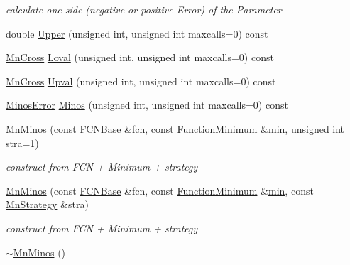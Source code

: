 \begin{DoxyCompactItemize}
\begin{DoxyCompactList}\small\item\em calculate one side (negative or positive Error) of the Parameter \end{DoxyCompactList}\item 
double \mbox{\hyperlink{classROOT_1_1Minuit2_1_1MnMinos_a387b76e3135998c519db7e6ae4cc3d90}{Upper}} (unsigned int, unsigned int maxcalls=0) const
\item 
\mbox{\hyperlink{classROOT_1_1Minuit2_1_1MnCross}{Mn\+Cross}} \mbox{\hyperlink{classROOT_1_1Minuit2_1_1MnMinos_a708381f90e4bd9118dec60726a1bdf73}{Loval}} (unsigned int, unsigned int maxcalls=0) const
\item 
\mbox{\hyperlink{classROOT_1_1Minuit2_1_1MnCross}{Mn\+Cross}} \mbox{\hyperlink{classROOT_1_1Minuit2_1_1MnMinos_a6fb073e7f84cb2d038714e362eda732a}{Upval}} (unsigned int, unsigned int maxcalls=0) const
\item 
\mbox{\hyperlink{classROOT_1_1Minuit2_1_1MinosError}{Minos\+Error}} \mbox{\hyperlink{classROOT_1_1Minuit2_1_1MnMinos_aeb1fe39f5851b5af050191d812d21723}{Minos}} (unsigned int, unsigned int maxcalls=0) const
\item 
\mbox{\hyperlink{classROOT_1_1Minuit2_1_1MnMinos_ac64ec75423efa6e473ee722f08f47eb4}{Mn\+Minos}} (const \mbox{\hyperlink{classROOT_1_1Minuit2_1_1FCNBase}{F\+C\+N\+Base}} \&fcn, const \mbox{\hyperlink{classROOT_1_1Minuit2_1_1FunctionMinimum}{Function\+Minimum}} \&\mbox{\hyperlink{SU3__internal_8h_ab0f5fed3171eb00d1c5f037d9f518a23}{min}}, unsigned int stra=1)
\begin{DoxyCompactList}\small\item\em construct from F\+CN + Minimum + strategy \end{DoxyCompactList}\item 
\mbox{\hyperlink{classROOT_1_1Minuit2_1_1MnMinos_a80f912ade0dd48d937bc04b14e28623c}{Mn\+Minos}} (const \mbox{\hyperlink{classROOT_1_1Minuit2_1_1FCNBase}{F\+C\+N\+Base}} \&fcn, const \mbox{\hyperlink{classROOT_1_1Minuit2_1_1FunctionMinimum}{Function\+Minimum}} \&\mbox{\hyperlink{SU3__internal_8h_ab0f5fed3171eb00d1c5f037d9f518a23}{min}}, const \mbox{\hyperlink{classROOT_1_1Minuit2_1_1MnStrategy}{Mn\+Strategy}} \&stra)
\begin{DoxyCompactList}\small\item\em construct from F\+CN + Minimum + strategy \end{DoxyCompactList}\item 
\mbox{\hyperlink{classROOT_1_1Minuit2_1_1MnMinos_a64625d0dd4308a7c8fb8930c980f11bd}{$\sim$\+Mn\+Minos}} ()

\end{DoxyCompactItemize}
